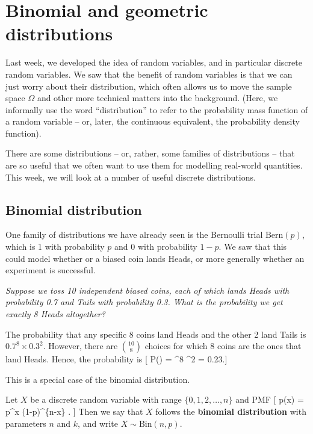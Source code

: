 \documentclass[
  letterpaper,
]{report}
\theoremstyle{definition}
\theoremstyle{definition}
\theoremstyle{remark}
\begin{document}
\hypertarget{L11-binomial-poisson}{%
\chapter{Binomial and geometric
distributions}\label{L11-binomial-poisson}}

Last week, we developed the idea of random variables, and in particular
discrete random variables. We saw that the benefit of random variables
is that we can just worry about their distribution, which often allows
us to move the sample space \(\Omega\) and other more technical matters
into the background. (Here, we informally use the word ``distribution''
to refer to the probability mass function of a random variable -- or,
later, the continuous equivalent, the probability density function).

There are some distributions -- or, rather, some families of
distributions -- that are so useful that we often want to use them for
modelling real-world quantities. This week, we will look at a number of
useful discrete distributions.

\hypertarget{binomial}{%
\section{Binomial distribution}\label{binomial}}

One family of distributions we have already seen is the Bernoulli trial
\(\text{Bern}(p)\), which is 1 with probability \(p\) and 0 with
probability \(1-p\). We saw that this could model whether or a biased
coin lands Heads, or more generally whether an experiment is successful.

\emph{Suppose we toss 10 independent biased coins, each of which lands
Heads with probability 0.7 and Tails with probability 0.3. What is the
probability we get exactly 8 Heads altogether?}

The probability that any specific 8 coins land Heads and the other 2
land Tails is \(0.7^8\times 0.3^2\). However, there are
\(\binom{10}{8}\) choices for which 8 coins are the ones that land
Heads. Hence, the probability is {[} \mathbb P() =
 \^{}8 \^{}2 = 0.23.{]}

This is a special case of the binomial distribution.

Let \(X\) be a discrete random variable with range \(\{0,1,2,\dots,n\}\)
and PMF {[} p(x) =  p\^{}x (1-p)\^{}\{n-x\} . {]} Then we
say that \(X\) follows the \textbf{binomial distribution} with
parameters \(n\) and \(k\), and write \(X \sim \text{Bin}(n,p)\).
\end{document}
